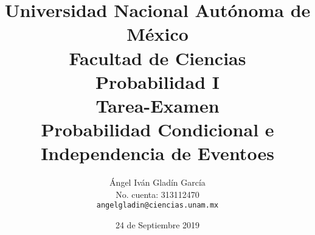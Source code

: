 \documentclass[11pt,letterpaper]{report}
\begin{document}
\title{
        Universidad Nacional Autónoma de México\\
        Facultad de Ciencias\\
        Probabilidad I\\
    \vspace{1cm}
    \large
        \textbf{Tarea-Examen}\\
        \textbf{Probabilidad Condicional e Independencia de Eventoes}
}
\author{
    Ángel Iván Gladín García\\
    No. cuenta: 313112470\\
    \texttt{angelgladin@ciencias.unam.mx}
}
\date{24 de Septiembre 2019}
\maketitle

\newtheorem{theorem}{Teorema}
\newtheorem{example}{Ejemplo}
\newtheorem{corollary}{Corolario}
\newtheorem{lemma}{Lemma}
\newtheorem{definition}{Definicion}
\newtheorem{prop}{Proposicion}
\end{document}
